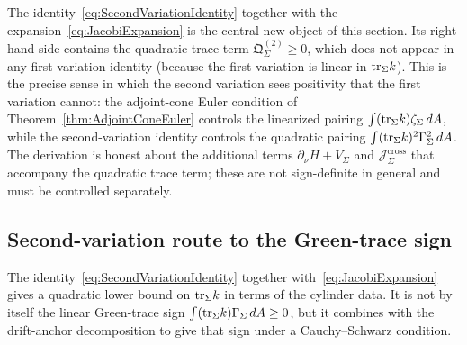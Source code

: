 \begin{remark}\label{rem:SecondVariationNew}
The identity~\eqref{eq:SecondVariationIdentity} together with the expansion~\eqref{eq:JacobiExpansion} is the central new object of this section. Its right-hand side contains the quadratic trace term $\mathfrak Q_\Sigma^{(2)}\ge0$, which does not appear in any first-variation identity (because the first variation is linear in $\mathrm{tr}_\Sigma k$). This is the precise sense in which the second variation sees positivity that the first variation cannot: the adjoint-cone Euler condition of Theorem~\ref{thm:AdjointConeEuler} controls the linearized pairing $\int(\mathrm{tr}_\Sigma k)\zeta_\Sigma\,dA$, while the second-variation identity controls the quadratic pairing $\int(\mathrm{tr}_\Sigma k)^2\Gamma_\Sigma^2\,dA$. The derivation is honest about the additional terms $\partial_\nu H + V_\Sigma$ and $\mathcal J_\Sigma^{\mathrm{cross}}$ that accompany the quadratic trace term; these are not sign-definite in general and must be controlled separately.
\end{remark}

\subsection{Second-variation route to the Green-trace sign}

The identity~\eqref{eq:SecondVariationIdentity} together with~\eqref{eq:JacobiExpansion} gives a quadratic lower bound on $\mathrm{tr}_\Sigma k$ in terms of the cylinder data. It is not by itself the linear Green-trace sign $\int(\mathrm{tr}_\Sigma k)\Gamma_\Sigma\,dA\ge0$, but it combines with the drift-anchor decomposition to give that sign under a Cauchy--Schwarz condition.

